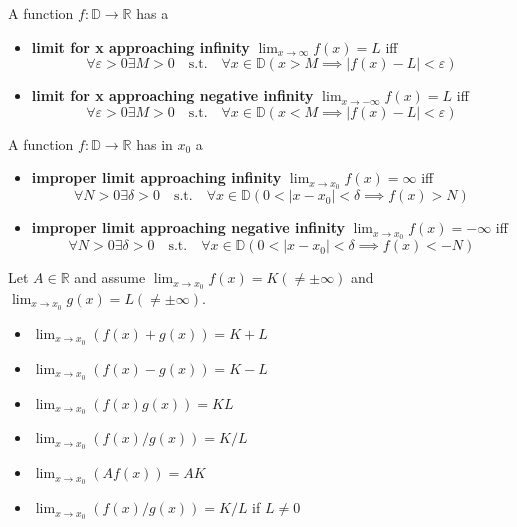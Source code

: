 \begin{definition}
    A function $f: \mathbb{D} \to \mathbb{R}$ has a
    \begin{itemize}
        \item \textbf{limit for x approaching infinity} $\lim_{x \to \infty} f(x) = L$ iff 
        $$\forall \varepsilon > 0 \exists M > 0 \quad \text{s.t.} \quad \forall x \in \mathbb{D} (x > M \implies |f(x) - L| < \varepsilon)$$
        \item \textbf{limit for x approaching negative infinity} $\lim_{x \to -\infty} f(x) = L$ iff 
        $$\forall \varepsilon > 0 \exists M > 0 \quad \text{s.t.} \quad \forall x \in \mathbb{D} (x < M \implies |f(x) - L| < \varepsilon)$$
    \end{itemize}
\end{definition}

\begin{definition}
    A function $f: \mathbb{D} \to \mathbb{R}$ has in $x_0$ a
    \begin{itemize}
        \item \textbf{improper limit approaching infinity} $\lim_{x \to x_0} f(x) = \infty$ iff 
        $$\forall N > 0 \exists \delta > 0 \quad \text{s.t.} \quad \forall x \in \mathbb{D} (0 < |x - x_0| < \delta \implies f(x) > N)$$
        \item \textbf{improper limit approaching negative infinity} $\lim_{x \to x_0} f(x) = -\infty$ iff 
        $$\forall N > 0 \exists \delta > 0 \quad \text{s.t.} \quad \forall x \in \mathbb{D} (0 < |x - x_0| < \delta \implies f(x) < -N)$$
     \end{itemize}
\end{definition}

\begin{theorem}
    Let $A \in \mathbb{R}$ and assume $\lim_{x \to x_0} f(x) = K (\neq \pm \infty)$ and $\lim_{x \to x_0} g(x) = L (\neq \pm \infty)$.
    \begin{itemize}
        \item $\lim_{x \to x_0} (f(x) + g(x)) = K + L$
        \item $\lim_{x \to x_0} (f(x) - g(x)) = K - L$
        \item $\lim_{x \to x_0} (f(x) g(x)) = K L$
        \item $\lim_{x \to x_0} (f(x) / g(x)) = K / L$
        \item $\lim_{x \to x_0} (A f(x)) = A K$
        \item $\lim_{x \to x_0} (f(x)/g(x)) = K/L$ if $L \neq 0$
    \end{itemize}
\end{theorem}

